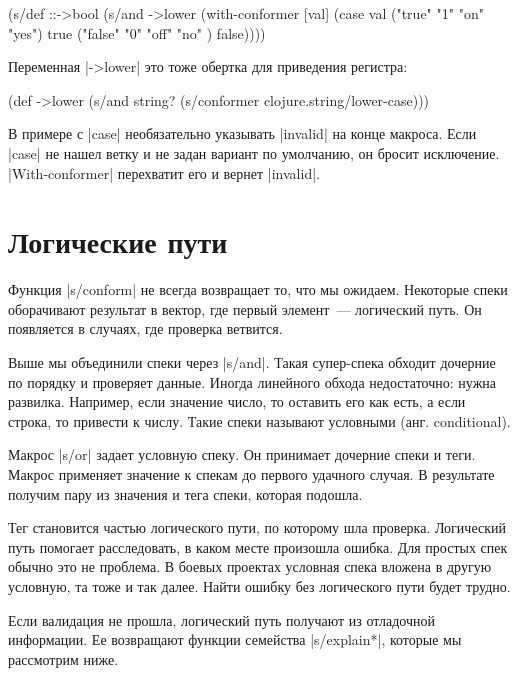 \begin{english}
  \begin{clojure}
(s/def ::->bool
  (s/and
   ->lower
   (with-conformer [val]
     (case val
       ("true"  "1" "on"  "yes") true
       ("false" "0" "off" "no" ) false))))
  \end{clojure}
\end{english}

\noindent
Переменная \spverb|->lower| это тоже обертка для приведения регистра:

\begin{english}
  \begin{clojure}
(def ->lower
  (s/and
    string?
    (s/conformer clojure.string/lower-case)))
  \end{clojure}
\end{english}

В примере с \spverb|case| необязательно указывать \spverb|invalid| на конце
макроса. Если \spverb|case| не нашел ветку и не задан вариант по умолчанию, он
бросит исключение. \spverb|With-conformer| перехватит его и вернет
\spverb|invalid|.

\section{Логические пути}

Функция \spverb|s/conform| не всегда возвращает то, что мы ожидаем. Некоторые
спеки оборачивают результат в вектор, где первый элемент~--- логический путь. Он
появляется в случаях, где проверка ветвится.

Выше мы объединили спеки через \spverb|s/and|. Такая супер-спека обходит
дочерние по порядку и проверяет данные. Иногда линейного обхода недостаточно:
нужна развилка. Например, если значение число, то оставить его как есть, а если
строка, то привести к числу. Такие спеки называют условными (анг. conditional).

Макрос \spverb|s/or| задает условную спеку. Он принимает дочерние спеки и
теги. Макрос применяет значение к спекам до первого удачного случая. В
результате получим пару из значения и тега спеки, которая подошла.

Тег становится частью логического пути, по которому шла проверка. Логический
путь помогает расследовать, в каком месте произошла ошибка. Для простых спек
обычно это не проблема. В боевых проектах условная спека вложена в другую
условную, та тоже и так далее. Найти ошибку без логического пути будет трудно.

Если валидация не прошла, логический путь получают из отладочной информации. Ее
возвращают функции семейства \spverb|s/explain*|, которые мы рассмотрим ниже.


